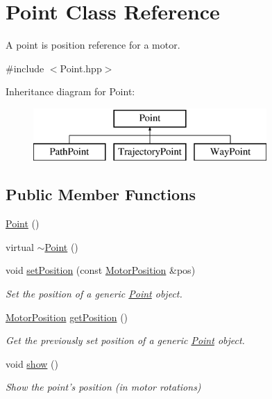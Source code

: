 \hypertarget{classPoint}{\section{Point Class Reference}
\label{classPoint}
}


A point is position reference for a motor.  




{\ttfamily \#include $<$Point.\-hpp$>$}

Inheritance diagram for Point\-:\begin{figure}[H]
\begin{center}
\leavevmode
\includegraphics[height=2.000000cm]{classPoint}
\end{center}
\end{figure}
\subsection*{Public Member Functions}
\begin{DoxyCompactItemize}
\item 
\hyperlink{classPoint_ad92f2337b839a94ce97dcdb439b4325a}{Point} ()
\item 
virtual \hyperlink{classPoint_a395fa04b4ec126b66fc053f829a30cc1}{$\sim$\-Point} ()
\item 
void \hyperlink{classPoint_a9c48c0459d14654e7c69e234c82daf2c}{set\-Position} (const \hyperlink{classMotorPosition}{Motor\-Position} \&pos)
\begin{DoxyCompactList}\small\item\em Set the position of a generic \hyperlink{classPoint}{Point} object. \end{DoxyCompactList}\item 
\hyperlink{classMotorPosition}{Motor\-Position} \hyperlink{classPoint_a91c04983e9805cd26751ac03135f9f21}{get\-Position} ()
\begin{DoxyCompactList}\small\item\em Get the previously set position of a generic \hyperlink{classPoint}{Point} object. \end{DoxyCompactList}\item 
void \hyperlink{classPoint_a2cc92f1333e1c9f3cabfb02243d7e65a}{show} ()
\begin{DoxyCompactList}\small\item\em Show the point's position (in motor rotations) \end{DoxyCompactList}\end{DoxyCompactItemize}
